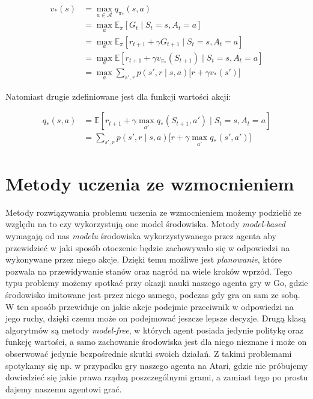 \documentclass[licencjacka]{pracamgr}
\begin{document}
\begin{align}
v_{\ast}(s) &= \max_{a \in \mathcal{A}} q_{\pi_{\ast}}(s, a) \nonumber \\
&= \max_a \mathbb{E}_{\pi}[G_t \mid S_t = s, A_t = a]  \nonumber \\
&= \max_a \mathbb{E}_{\pi}[r_{t+1} + \gamma G_{t+1} \mid S_t = s, A_t = a] \nonumber \\
&= \max_a \mathbb{E}[r_{t+1} + \gamma v_{\pi_{\ast}}(S_{t+1}) \mid S_t = s, A_t = a] \nonumber \\
&= \max_a \sum_{s', r} p(s', r \mid s, a) \Big[r + \gamma v_{\ast}(s') \Big]
\end{align}

Natomiast drugie zdefiniowane jest dla funkcji wartości akcji:

\begin{align}
q_{\ast}(s, a) &= \mathbb{E}[r_{t+1} + \gamma \max_{a'} q_{\ast} (S_{t+1}, a') \mid S_t = s, A_t = a] \nonumber \\
&= \sum_{s', r} p(s', r \mid s, a) \Big[r + \gamma \max_{a'} q_{\ast} (s', a') \Big]
\end{align}

\section{Metody uczenia ze wzmocnieniem}

Metody rozwiązywania problemu uczenia ze wzmocnieniem możemy podzielić ze względu na to czy wykorzystują one model środowiska. Metody \emph{model-based} wymagają od nas \emph{modelu} środowiska wykorzystywanego przez agenta aby przewidzieć w jaki sposób otoczenie będzie zachowywało się w odpowiedzi na wykonywane przez niego akcje.
Dzięki temu możliwe jest \emph{planowanie}, które pozwala na przewidywanie stanów oraz nagród na wiele kroków wprzód. Tego typu problemy możemy spotkać przy okazji nauki naszego agenta gry w Go\cite{alphago2016, alphagozero}, gdzie środowisko imitowane jest przez niego samego, podczas gdy gra on sam ze sobą. W ten sposób przewiduje on jakie akcje podejmie przeciwnik w odpowiedzi na jego ruchy, dzięki czemu może on podejmować jeszcze lepsze decyzje.
Drugą klasą algorytmów są metody \emph{model-free}, w których agent posiada jedynie politykę oraz funkcję wartości, a samo zachowanie środowiska jest dla niego nieznane i może on obserwować jedynie bezpośrednie skutki swoich działań. Z takimi problemami spotykamy się np. w przypadku gry naszego agenta na Atari, gdzie nie próbujemy dowiedzieć się jakie prawa rządzą poszczególnymi grami, a zamiast tego po prostu dajemy naszemu agentowi grać.
\end{document}
